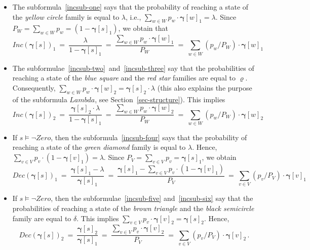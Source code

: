 \documentclass[a4paper,UKenglish,cleveref, autoref, thm-restate]{lipics-v2021}
\newcommand{\Zero}{\mathit{Zero}}
\newcommand{\INC}{\mathit{Inc}}
\newcommand{\DEC}{\mathit{Dec}}
\renewcommand{\vec}[1]{\pmb{#1}}
\newcommand{\FLambda}{\textit{Lambda}}
\newcommand{\cv}{\vec{\gamma}}
\begin{document}
\begin{itemize}
       \item The subformula~\eqref{incsub-one} says that the probability of reaching a state of the \emph{yellow circle} family is equal to $\lambda$, i.e., 
          $\sum_{w \in W} p_w \cdot \cv[w]_1 = \lambda$. Since $P_W = \sum_{w \in W} p_w = (1-\cv[s]_1)$, we obtain that
          \[
             \INC(\cv[s])_1 \ = \ 
             \frac{\lambda}{1-\cv[s]_1} \ = \ 
             \frac{\sum_{w \in W} p_w \cdot \cv[w]_1}{P_W} \ = \
             \sum_{w \in W} (p_w/P_W) \cdot \cv[w]_1
          \]
       \item The subformulae~\eqref{incsub-two}~and~\eqref{incsub-three} say that the probabilities of reaching a state of the \emph{blue square} and the \emph{red star} families are equal to $\varrho$. Consequently, $\sum_{w \in W} p_w \cdot \cv[w]_2 = \cv[s]_2 \cdot \lambda$ (this also explains the purpose of the subformula $\FLambda$, see Section~\ref{sec-structure}).
       This implies
          \[
             \INC(\cv[s])_2 \ = \ 
             \frac{\cv[s]_2 \cdot \lambda}{1-\cv[s]_1} \ = \ 
             \frac{\sum_{w \in W} p_w \cdot \cv[w]_2}{P_W} \ = \
             \sum_{w \in W} (p_w/P_W) \cdot \cv[w]_2
          \]
       \item If $s \models \neg\Zero$, then the subformula~\eqref{incsub-four} says that the probability of reaching a state of the \emph{green diamond} family is equal to $\lambda$. Hence, $\sum_{v \in V} p_v \cdot (1-\cv[v]_1) = \lambda$. Since $P_V = \sum_{v \in V} p_v = \cv[s]_1$, we obtain
          \[
             \DEC(\cv[s])_1 \ = \ 
             \frac{\cv[s]_1 - \lambda}{\cv[s]_1} \ = \ 
             \frac{\cv[s]_1 - \sum_{v \in V} p_v \cdot (1-\cv[v]_1)}{P_V} \ = \ 
             \sum_{v \in V} (p_v/P_V) \cdot \cv[v]_1
          \]
       \item If $s \models \neg\Zero$, then the subformulae~\eqref{incsub-five}
       and~\eqref{incsub-six} say that the probabilities of reaching a state of the \emph{brown triangle} and the \emph{black semicircle} family are equal to $\delta$. This implies
       $\sum_{v \in V} p_v \cdot \cv[v]_2 = \cv[s]_2$. Hence,
       \[
            \DEC(\cv[s])_2 \ = \ 
            \frac{\cv[s]_2}{\cv[s]_1} \ = \ 
            \frac{\sum_{v \in V} p_v \cdot \cv[v]_2}{P_V} \ = \ 
              \sum_{v \in V} (p_v/P_V) \cdot \cv[v]_2 \,.
       \]
\end{itemize}
\end{document}
